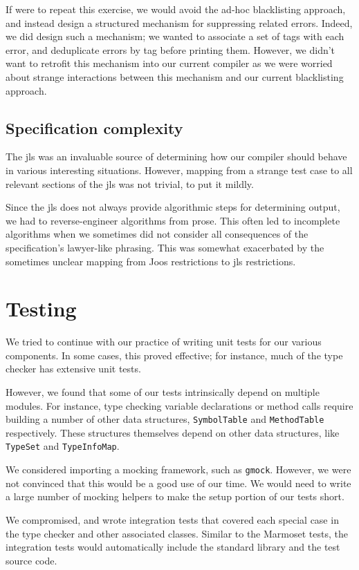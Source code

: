 \documentclass[12pt, titlepage]{article}
\newcommand{\z}[1]{\texttt{#1}}
\begin{document}
If were to repeat this exercise, we would avoid the ad-hoc blacklisting
approach, and instead design a structured mechanism for suppressing related
errors. Indeed, we did design such a mechanism; we wanted to associate a set of
tags with each error, and deduplicate errors by tag before printing them.
However, we didn't want to retrofit this mechanism into our current compiler as
we were worried about strange interactions between this mechanism and our
current blacklisting approach.

\subsection{Specification complexity}

The \ac{jls} was an invaluable source of determining how our compiler should
behave in various interesting situations. However, mapping from a strange test
case to all relevant sections of the \ac{jls} was not trivial, to put it
mildly.

Since the \ac{jls} does not always provide algorithmic steps for determining
output, we had to reverse-engineer algorithms from prose. This often led to
incomplete algorithms when we sometimes did not consider all consequences of
the specification's lawyer-like phrasing. This was somewhat exacerbated by the
sometimes unclear mapping from Joos restrictions to \ac{jls} restrictions.

\section{Testing}

We tried to continue with our practice of writing unit tests for our various
components. In some cases, this proved effective; for instance, much of the
type checker has extensive unit tests.

However, we found that some of our tests intrinsically depend on multiple
modules. For instance, type checking variable declarations or method calls
require building a number of other data structures, \z{SymbolTable} and
\z{MethodTable} respectively. These structures themselves depend on other data
structures, like \z{TypeSet} and \z{TypeInfoMap}.

We considered importing a mocking framework, such as \z{gmock}. However, we
were not convinced that this would be a good use of our time. We would need to
write a large number of mocking helpers to make the setup portion of our tests
short.

We compromised, and wrote integration tests that covered each special case in
the type checker and other associated classes. Similar to the Marmoset tests,
the integration tests would automatically include the standard library and the
test source code.
\end{document}
